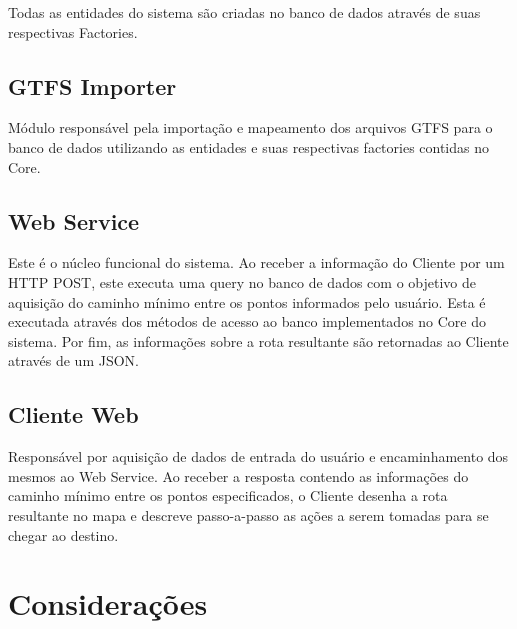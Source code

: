 Todas as entidades do sistema são criadas no banco de dados através de suas respectivas Factories. 


\subsection{GTFS Importer}
Módulo responsável pela importação e mapeamento dos arquivos GTFS para o banco de dados utilizando as entidades e suas respectivas factories contidas no Core. 

\subsection{Web Service}
Este é o núcleo funcional do sistema.
Ao receber a informação do Cliente por um HTTP POST, este executa uma query no banco de dados com o objetivo de aquisição do caminho mínimo entre os pontos informados pelo usuário. 
Esta é executada através dos métodos de acesso ao banco implementados no Core do sistema. 
Por fim, as informações sobre a rota resultante são retornadas ao Cliente através de um JSON.

\subsection{Cliente Web}
Responsável por aquisição de dados de entrada do usuário e encaminhamento dos mesmos ao Web Service. 
Ao receber a resposta contendo as informações do caminho mínimo entre os pontos especificados, o Cliente desenha a rota resultante no mapa e descreve passo-a-passo as ações a serem tomadas para se chegar ao destino.

\section{Considerações}

